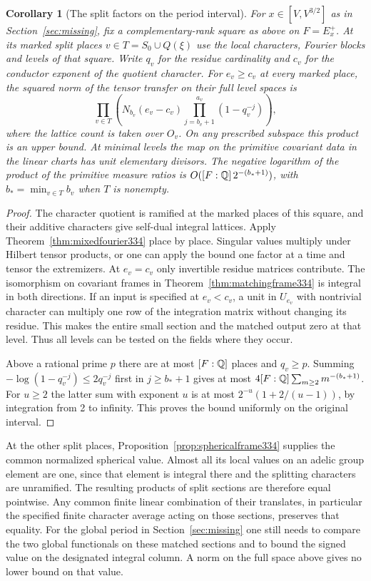 \documentclass[a4paper,11pt]{article}
\newtheorem{corollary}[proposition]{Corollary}
\theoremstyle{definition}
\theoremstyle{remark}
\numberwithin{equation}{section}
\begin{document}
\begin{corollary}[The split factors on the period interval]\label{cor:splitproduct334}
For \(x\in[V,V^{3/2}]\) as in Section~\ref{sec:missing}, fix a
complementary-rank square as above on \(F=E_x^+\). At its marked split
places \(v\in T=S_0\cup Q(\xi)\) use the local characters, Fourier blocks
and levels of that square. Write \(q_v\) for the residue cardinality and
\(c_v\) for the conductor exponent of the quotient character. For
\(e_v\ge c_v\) at every marked place, the squared norm of the tensor
transfer on their full level spaces is
\[
 \prod_{v\in T}
  \left(N_{b_v}(e_v-c_v)
        \prod_{j=b_v+1}^{a_v}(1-q_v^{-j})\right),
\]
where the lattice count is taken over \(O_v\). On any prescribed subspace
this product is an upper bound. At minimal levels the map on the
primitive covariant data in the linear charts has unit elementary
divisors. The negative logarithm of the product of the primitive measure
ratios is \(O([F:\mathbb Q]\,2^{-(b_*+1)})\), with \(b_*=\min_{v\in T}b_v\)
when \(T\) is nonempty.
\end{corollary}
\begin{proof}
The character quotient is ramified at the marked places of this square,
and their additive characters give self-dual integral lattices. Apply
Theorem~\ref{thm:mixedfourier334} place by place. Singular values multiply
under Hilbert tensor products, or one can apply the bound one factor at
a time and tensor the extremizers. At \(e_v=c_v\) only invertible
residue matrices contribute. The isomorphism on covariant frames in
Theorem~\ref{thm:matchingframe334} is integral in both directions.
If an input is specified at \(e_v<c_v\), a unit in \(U_{e_v}\) with
nontrivial character can multiply one row of the integration matrix
without changing its residue. This makes the entire small section and
the matched output zero at that level. Thus all levels can be tested on
the fields where they occur.

Above a rational prime \(p\) there are at most \([F:\mathbb Q]\) places and
\(q_v\ge p\). Summing \(-\log(1-q_v^{-j})\le2q_v^{-j}\) first in
\(j\ge b_*+1\) gives at most \(4[F:\mathbb Q]\sum_{m\ge2}m^{-(b_*+1)}\).
For \(u\ge2\) the latter sum with exponent \(u\) is at most
\(2^{-u}(1+2/(u-1))\), by integration from 2 to infinity. This proves
the bound uniformly on the original interval.
\end{proof}

At the other split places, Proposition~\ref{prop:sphericalframe334}
supplies the common normalized spherical value. Almost all its local
values on an adelic group element are one, since that element is integral
there and the splitting characters are unramified. The resulting products
of split sections are therefore equal pointwise. Any common finite linear
combination of their translates, in particular the specified finite
character average acting on those sections, preserves that equality.
For the global period in Section~\ref{sec:missing} one still needs to
compare the two global functionals on these matched sections and to
bound the signed value on the designated integral column. A norm on the
full space above gives no lower bound on that value.
\end{document}
